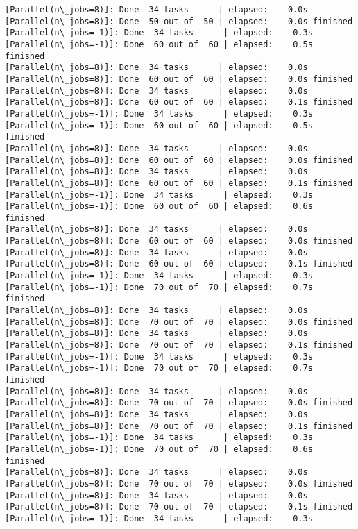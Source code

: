 \documentclass[11pt]{article}
\begin{document}
\begin{Verbatim}[commandchars=\\\{\}]
[Parallel(n\_jobs=8)]: Done  34 tasks      | elapsed:    0.0s
[Parallel(n\_jobs=8)]: Done  50 out of  50 | elapsed:    0.0s finished
[Parallel(n\_jobs=-1)]: Done  34 tasks      | elapsed:    0.3s
[Parallel(n\_jobs=-1)]: Done  60 out of  60 | elapsed:    0.5s finished
[Parallel(n\_jobs=8)]: Done  34 tasks      | elapsed:    0.0s
[Parallel(n\_jobs=8)]: Done  60 out of  60 | elapsed:    0.0s finished
[Parallel(n\_jobs=8)]: Done  34 tasks      | elapsed:    0.0s
[Parallel(n\_jobs=8)]: Done  60 out of  60 | elapsed:    0.1s finished
[Parallel(n\_jobs=-1)]: Done  34 tasks      | elapsed:    0.3s
[Parallel(n\_jobs=-1)]: Done  60 out of  60 | elapsed:    0.5s finished
[Parallel(n\_jobs=8)]: Done  34 tasks      | elapsed:    0.0s
[Parallel(n\_jobs=8)]: Done  60 out of  60 | elapsed:    0.0s finished
[Parallel(n\_jobs=8)]: Done  34 tasks      | elapsed:    0.0s
[Parallel(n\_jobs=8)]: Done  60 out of  60 | elapsed:    0.1s finished
[Parallel(n\_jobs=-1)]: Done  34 tasks      | elapsed:    0.3s
[Parallel(n\_jobs=-1)]: Done  60 out of  60 | elapsed:    0.6s finished
[Parallel(n\_jobs=8)]: Done  34 tasks      | elapsed:    0.0s
[Parallel(n\_jobs=8)]: Done  60 out of  60 | elapsed:    0.0s finished
[Parallel(n\_jobs=8)]: Done  34 tasks      | elapsed:    0.0s
[Parallel(n\_jobs=8)]: Done  60 out of  60 | elapsed:    0.1s finished
[Parallel(n\_jobs=-1)]: Done  34 tasks      | elapsed:    0.3s
[Parallel(n\_jobs=-1)]: Done  70 out of  70 | elapsed:    0.7s finished
[Parallel(n\_jobs=8)]: Done  34 tasks      | elapsed:    0.0s
[Parallel(n\_jobs=8)]: Done  70 out of  70 | elapsed:    0.0s finished
[Parallel(n\_jobs=8)]: Done  34 tasks      | elapsed:    0.0s
[Parallel(n\_jobs=8)]: Done  70 out of  70 | elapsed:    0.1s finished
[Parallel(n\_jobs=-1)]: Done  34 tasks      | elapsed:    0.3s
[Parallel(n\_jobs=-1)]: Done  70 out of  70 | elapsed:    0.7s finished
[Parallel(n\_jobs=8)]: Done  34 tasks      | elapsed:    0.0s
[Parallel(n\_jobs=8)]: Done  70 out of  70 | elapsed:    0.0s finished
[Parallel(n\_jobs=8)]: Done  34 tasks      | elapsed:    0.0s
[Parallel(n\_jobs=8)]: Done  70 out of  70 | elapsed:    0.1s finished
[Parallel(n\_jobs=-1)]: Done  34 tasks      | elapsed:    0.3s
[Parallel(n\_jobs=-1)]: Done  70 out of  70 | elapsed:    0.6s finished
[Parallel(n\_jobs=8)]: Done  34 tasks      | elapsed:    0.0s
[Parallel(n\_jobs=8)]: Done  70 out of  70 | elapsed:    0.0s finished
[Parallel(n\_jobs=8)]: Done  34 tasks      | elapsed:    0.0s
[Parallel(n\_jobs=8)]: Done  70 out of  70 | elapsed:    0.1s finished
[Parallel(n\_jobs=-1)]: Done  34 tasks      | elapsed:    0.3s

\end{Verbatim}
\end{document}
